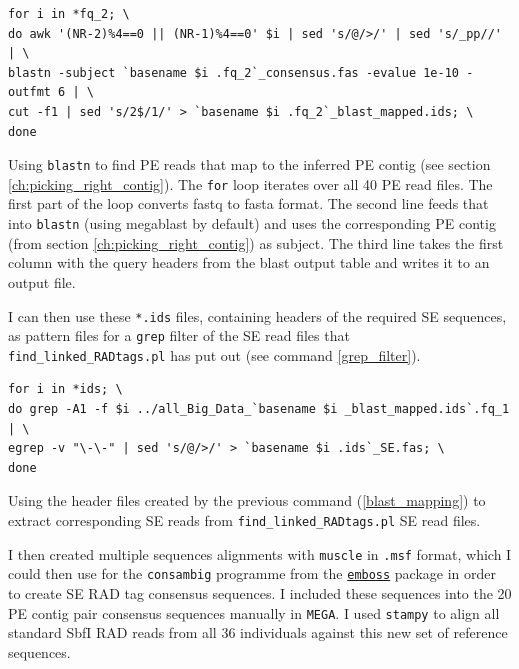 \documentclass[a4paper,12pt,times,print,index,custombib,custommargin]{PhDThesisPSnPDF}\usepackage[]{graphicx}\usepackage[]{color}
\begin{document}
\begin{cmd}
\captionsetup{type=cmd}
\begin{Verbatim}[fontsize=\scriptsize, formatcom=\color{darkgray}]
for i in *fq_2; \
do awk '(NR-2)%4==0 || (NR-1)%4==0' $i | sed 's/@/>/' | sed 's/_pp//' | \
blastn -subject `basename $i .fq_2`_consensus.fas -evalue 1e-10 -outfmt 6 | \
cut -f1 | sed 's/2$/1/' > `basename $i .fq_2`_blast_mapped.ids; \
done
\end{Verbatim}
\caption{\small Using \texttt{blastn} to find PE reads that map to the inferred PE contig (see section \vref{ch:picking_right_contig}). The \texttt{for} loop iterates over all 40 PE read files. The first part of the loop converts fastq to fasta format. The second line feeds that into \texttt{blastn} (using megablast by default) and uses the corresponding PE contig (from section \ref{ch:picking_right_contig}) as subject. The third line takes the first column with the query headers from the blast output table and writes it to an output file.
}
\label{blast_mapping} 
\end{cmd}

I can then use these \texttt{*.ids} files, containing headers of the required SE sequences, as pattern files for a \texttt{grep} filter of the SE read files that \texttt{find\_linked\_RADtags.pl} has put out (see command \ref{grep_filter}).

\begin{cmd}
\captionsetup{type=cmd}
\begin{Verbatim}[fontsize=\scriptsize, formatcom=\color{darkgray}]
for i in *ids; \
do grep -A1 -f $i ../all_Big_Data_`basename $i _blast_mapped.ids`.fq_1 | \
egrep -v "\-\-" | sed 's/@/>/' > `basename $i .ids`_SE.fas; \
done
\end{Verbatim}
\caption{\small Using the header files created by the previous command (\ref{blast_mapping}) to extract corresponding SE reads from \texttt{find\_linked\_RADtags.pl} SE read files.}
\label{grep_filter}
\end{cmd}

I then created multiple sequences alignments with \texttt{muscle} in \texttt{.msf} format, which I could then use for the \texttt{consambig} programme from the \href{http://emboss.sourceforge.net/apps/release/6.6/emboss/apps/consambig.html}{\texttt{emboss}} package in order to create SE \gls{RAD tag} consensus sequences. I included these sequences into the 20 PE contig pair consensus sequences manually in \texttt{MEGA}. I used \texttt{stampy} to align all standard SbfI RAD reads from all 36 individuals against this new set of reference sequences.
\end{document}
